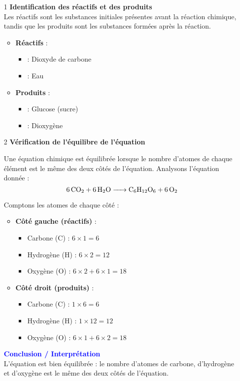 \documentclass[a4paper,12pt]{article}
\begin{document}
\begin{itemize}

  \item[1] \textbf{Identification des réactifs et des produits} \\
    Les réactifs sont les substances initiales présentes avant la réaction chimique, tandis que les produits sont les substances formées après la réaction.
    \begin{itemize}
        \item \textbf{Réactifs} : 
        \begin{itemize}
            \item {} : Dioxyde de carbone
            \item {} : Eau
        \end{itemize}
        
        \item \textbf{Produits} :
        \begin{itemize}
            \item {} : Glucose (sucre)
            \item {} : Dioxygène
        \end{itemize}
    \end{itemize}

    \item[2] \textbf{Vérification de l'équilibre de l'équation}
    
    Une équation chimique est équilibrée lorsque le nombre d'atomes de chaque élément est le même des deux côtés de l'équation. Analysons l'équation donnée :
    \[
    \ce{6CO2 + 6H2O -> C6H12O6 + 6O2}
    \]

    Comptons les atomes de chaque côté :
    \begin{itemize}[noitemsep]
        \item \textbf{Côté gauche (réactifs)} :
        \begin{itemize}
            \item Carbone (C) : $6 \times 1 = 6$
            \item Hydrogène (H) : $6 \times 2 = 12$
            \item Oxygène (O) : $6 \times 2 + 6 \times 1 = 18$
        \end{itemize}
        
        \item \textbf{Côté droit (produits)} :
        \begin{itemize}
            \item Carbone (C) : $1 \times 6 = 6$
            \item Hydrogène (H) : $1 \times 12 = 12$
            \item Oxygène (O) : $6 \times 1 + 6 \times 2 = 18$
        \end{itemize}
    \end{itemize}
    
    \textcolor{blue}{\textbf{Conclusion / Interprétation}} \\
    L'équation est bien équilibrée : le nombre d'atomes de carbone, d'hydrogène et d'oxygène est le même des deux côtés de l'équation.
    
\end{itemize}
\end{document}
